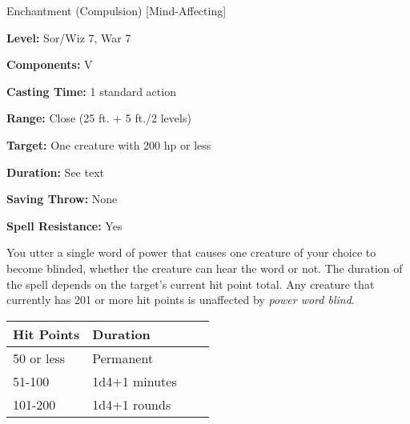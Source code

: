 
Enchantment (Compulsion) [Mind-Affecting]

\textbf{Level:} Sor/Wiz 7, War 7

\textbf{Components:} V

\textbf{Casting Time:} 1 standard action

\textbf{Range:} Close (25 ft. + 5 ft./2 levels)

\textbf{Target:} One creature with 200 hp or less

\textbf{Duration:} See text

\textbf{Saving Throw:} None

\textbf{Spell Resistance:} Yes

You utter a single word of power that causes one creature of your choice to become 
blinded, whether the creature can hear the word or not. The duration of the spell 
depends on the target's current hit point total. Any creature that currently has 
201 or more hit points is unaffected by \textit{power word blind}.

\begin{longtable}{llll}
\hline
\multicolumn{1}{|p{0.749in}|}{\begin{minipage}[t]{0.749in}\raggedright
\textbf{Hit Points}\end{minipage}} & \multicolumn{1}{p{0.981in}|}{\begin{minipage}[t]{0.981in}\raggedright
\textbf{Duration}\end{minipage}}\\
\hline
\multicolumn{1}{p{0.069in}|}{\begin{minipage}[t]{0.069in}\raggedright
50 or less\end{minipage}} & \multicolumn{1}{p{0.069in}|}{\begin{minipage}[t]{0.069in}\raggedright
Permanent\end{minipage}}\\
\hline
\multicolumn{1}{|p{0.749in}|}{\begin{minipage}[t]{0.749in}\raggedright
51-100\end{minipage}} & \multicolumn{1}{p{0.981in}|}{\begin{minipage}[t]{0.981in}\raggedright
1d4+1 minutes\end{minipage}}\\
\hline
\multicolumn{1}{p{0.069in}|}{\begin{minipage}[t]{0.069in}\raggedright
101-200\end{minipage}} & \multicolumn{1}{p{0.069in}|}{\begin{minipage}[t]{0.069in}\raggedright
1d4+1 rounds\end{minipage}}\\
\hline
\end{longtable}

